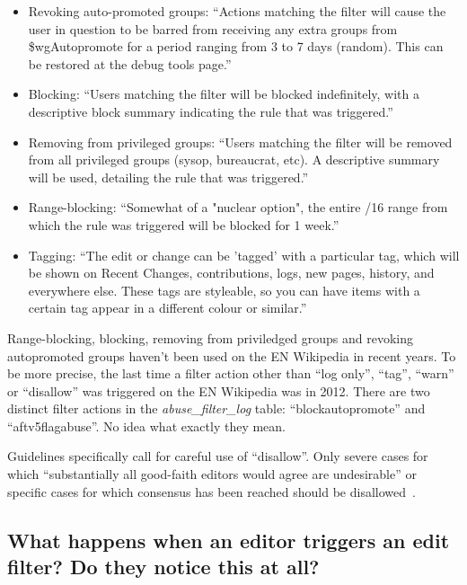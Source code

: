 \begin{itemize}
    \item Revoking auto-promoted groups: ``Actions matching the filter will cause the user in question to be barred from receiving any extra groups from \$wgAutopromote for a period ranging from 3 to 7 days (random). This can be restored at the debug tools page.''
    \item Blocking: ``Users matching the filter will be blocked indefinitely, with a descriptive block summary indicating the rule that was triggered.''
    \item Removing from privileged groups: ``Users matching the filter will be removed from all privileged groups (sysop, bureaucrat, etc). A descriptive summary will be used, detailing the rule that was triggered.''
    \item Range-blocking: ``Somewhat of a "nuclear option", the entire /16 range from which the rule was triggered will be blocked for 1 week.''
    \item Tagging: ``The edit or change can be 'tagged' with a particular tag, which will be shown on Recent Changes, contributions, logs, new pages, history, and everywhere else. These tags are styleable, so you can have items with a certain tag appear in a different colour or similar.''
\end{itemize}

Range-blocking, blocking, removing from priviledged groups and revoking autopromoted groups haven't been used on the EN Wikipedia in recent years. %
To be more precise, the last time a filter action other than ``log only'', ``tag'', ``warn'' or ``disallow'' was triggered on the EN Wikipedia was in 2012. %
There are two distinct filter actions in the \emph{abuse\_filter\_log} table: ``blockautopromote'' and ``aftv5flagabuse''.
No idea what exactly they mean.

Guidelines specifically call for careful use of ``disallow''.
Only severe cases for which ``substantially all good-faith editors would agree are undesirable'' or specific cases for which consensus has been reached should be disallowed~\cite{Wikipedia:EditFilter}.

\subsection{What happens when an editor triggers an edit filter? Do they notice this at all?}

